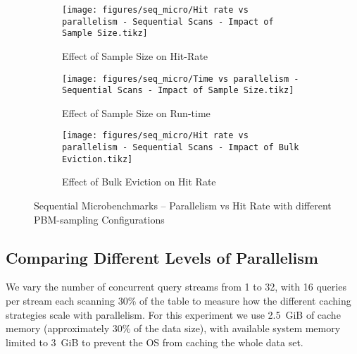 \begin{figure*}
    \begin{subfigure}{\textwidth}
        \centering
        \texttt{[image: figures/seq\_micro/Hit rate vs parallelism - Sequential Scans - Impact of Sample Size.tikz]}
        \caption{Effect of Sample Size on Hit-Rate}
        \label{fig:seq_micro_parallel_hitrate_samplesize}
    \end{subfigure}
    \begin{subfigure}{\textwidth}
        \centering
        \texttt{[image: figures/seq\_micro/Time vs parallelism - Sequential Scans - Impact of Sample Size.tikz]}
        \caption{Effect of Sample Size on Run-time}
        \label{fig:seq_micro_parallel_time_samplesize}
    \end{subfigure}
    \begin{subfigure}{\textwidth}
        \centering
        \texttt{[image: figures/seq\_micro/Hit rate vs parallelism - Sequential Scans - Impact of Bulk Eviction.tikz]}
        \caption{Effect of Bulk Eviction on Hit Rate}
        \label{fig:seq_micro_parallel_hitrate_bulk}
    \end{subfigure}
    \caption{Sequential Microbenchmarks -- Parallelism vs Hit Rate with different PBM-sampling Configurations}
    \label{fig:seq_micro_parallel_samplingparams}
\end{figure*}


\subsection{Comparing Different Levels of Parallelism}
\label{sec:experiment_micro_parallelism}

We vary the number of concurrent query streams from 1 to 32, with 16 queries per stream each scanning 30\% of the table to measure how the different caching strategies scale with parallelism. For this experiment we use 2.5~GiB of cache memory (approximately 30\% of the data size), with available system memory limited to 3~GiB to prevent the OS from caching the whole data set. %



